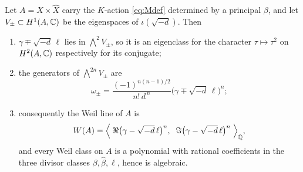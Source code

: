 \begin{theorem}\label{thm:splitclosed}
Let $A=X\times\widehat{X}$ carry the $K$-action \eqref{eq:Mdef} determined by a
principal $\beta$, and let $V_{\pm}\subset H^{1}(A,\mathbb{C})$ be the eigenspaces of
$\iota(\sqrt{-d})$. Then
\begin{enumerate}[label=\textup{(\roman*)},nosep]
\item $\gamma\mp\sqrt{-d}\,\ell$ lies in $\bigwedge^{2}V_{\pm}$, so it is an
  eigenclass for the character $\tau\mapsto\tau^{2}$ on $H^{2}(A,\mathbb{C})$
  respectively for its conjugate;
\item the generators of $\bigwedge^{2n}V_{\pm}$ are
  \begin{equation}\label{eq:splitclosed}
    \omega_{\pm}
    =\frac{(-1)^{n(n-1)/2}}{n!\,d^{\,n}}
      \bigl(\gamma\mp\sqrt{-d}\,\ell\bigr)^{n};
  \end{equation}
\item consequently the Weil line of $A$ is
  \[
    W(A)=\Bigl\langle\;
      \Re\bigl(\gamma-\sqrt{-d}\,\ell\bigr)^{n},\;\;
      \Im\bigl(\gamma-\sqrt{-d}\,\ell\bigr)^{n}
    \;\Bigr\rangle_{\mathbb{Q}},
  \]
  and every Weil class on $A$ is a polynomial with rational coefficients in
  the three divisor classes $\beta,\widehat{\beta},\ell$, hence is algebraic.
\end{enumerate}
\end{theorem}

